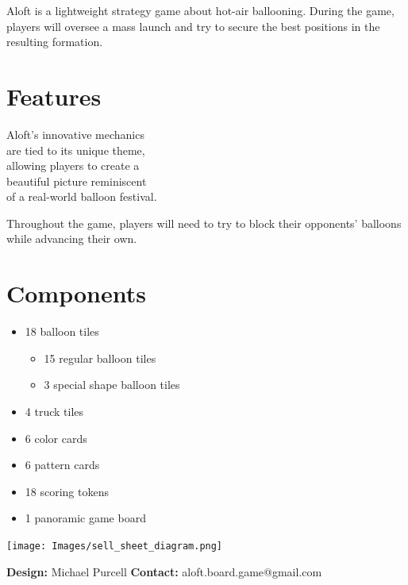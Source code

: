 \documentclass[a5paper, DIV=18, 12pt]{scrartcl}
\begin{document}
\vspace{-0.5ex}
\flushleft
Aloft is a lightweight strategy game about hot-air ballooning. During the game, players will oversee a mass launch and try to secure the best positions in the resulting formation.
\flushleft
\vspace{-0ex}
\begin{multicols}{2}
\section*{\textcolor{SunriseBlue}{Features}}
Aloft's innovative mechanics\\are tied to its unique theme,\\ allowing players to create a\\beautiful picture reminiscent\\of a real-world balloon festival.
\vspace{2.03ex}
 
Throughout the game, players will need to try to block their opponents' balloons while advancing their own.  \vfill\null\columnbreak

\section*{\textcolor{SunriseBlue}{Components}}
\begin{itemize}[nosep, leftmargin=*]
	\item 18 balloon tiles
	\begin{itemize}[nosep, leftmargin=*]
	  \item 15 regular balloon tiles
	  \item 3 special shape balloon tiles
	\end{itemize}
	\vspace{0.92ex}
	\item 4 truck tiles
	\vspace{0.92ex}
	\item 6 color cards
	\vspace{0.92ex}
	\item 6 pattern cards
	\vspace{0.92ex}
	\item 18 scoring tokens
	\vspace{0.92ex}
	\item 1 panoramic game board
\end{itemize}
\vspace{3.2ex}
\end{multicols}
\begin{center}
\vspace{-1.5ex}
\texttt{[image: Images/sell\_sheet\_diagram.png]}
\end{center}
\textbf{Design:} Michael Purcell \hfill \textbf{Contact:} aloft.board.game@gmail.com
\end{document}
